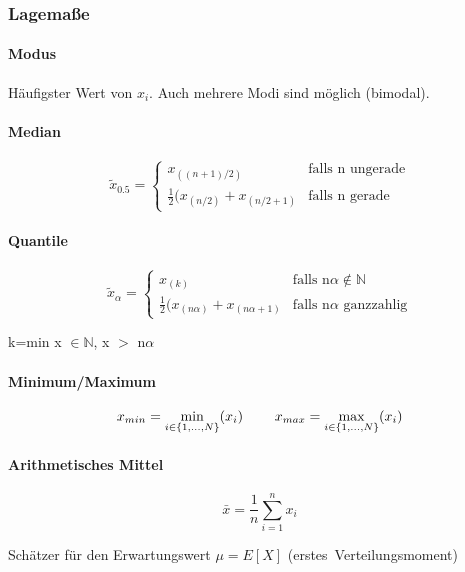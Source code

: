 \documentclass[10pt]{article}
\begin{document}
\subsubsection{Lagemaße}
\begin{multicols}{2}

\paragraph{Modus}

Häufigster Wert von $x_i$. Auch mehrere Modi sind möglich (bimodal).

\paragraph{Median}

$$\tilde{x}_{0.5}=\begin{cases} x_{((n+1)/2)} & \text{falls n ungerade} \\ \frac{1}{2}(x_{(n/2)}+x_{(n/2+1)} & \text{falls n gerade} \end{cases}$$

\paragraph{Quantile}

$$\tilde{x}_\alpha=\begin{cases} x_{(k)} & \text{falls n}\alpha \notin \mathbb{N}\\ \frac{1}{2}(x_{(n\alpha)}+ x_{(n\alpha+1)} & \text{falls n}\alpha \text{ ganzzahlig} \end{cases}$$

k=min x $\in \mathbb{N}$,  x $>$ n$\alpha$ 

\paragraph{Minimum/Maximum}


$$x_{min}=\min_{i \in \{ 1,...,N\}} (x_i) \hspace{0.8cm}   x_{max}=\max_{i \in \{ 1,...,N\}} (x_i)$$ 



\paragraph{Arithmetisches Mittel}

 $$\bar{x}=\frac{1}{n}\sum\limits_{i=1}^n x_i$$

\noindent Schätzer für den Erwartungswert 
$\mu = E[X]$ (erstes~Verteilungsmoment)


\end{multicols}
\end{document}
